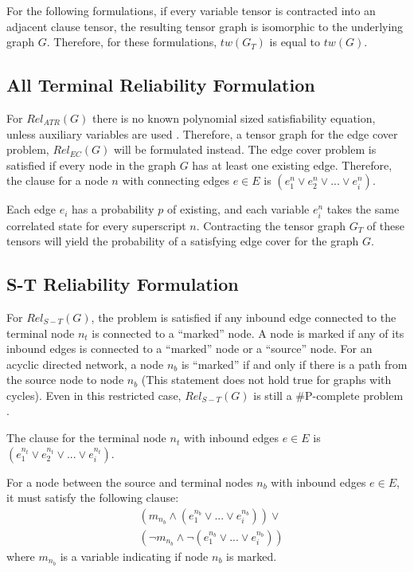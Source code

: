 For the following formulations, if every variable tensor is contracted into an adjacent clause tensor, the resulting tensor graph is isomorphic to the underlying graph \(G\). Therefore, for these formulations, \(tw(G_T)\) is equal to \(tw(G)\).

\hypertarget{all-terminal-reliability-formulation}{%
\subsection{All Terminal Reliability Formulation}\label{all-terminal-reliability-formulation}}

For \(Rel_{ATR}(G)\) there is no known polynomial sized satisfiability equation, unless auxiliary variables are used \cite{paredes2019principled}. Therefore, a tensor graph for the edge cover problem, \(Rel_{EC}(G)\) will be formulated instead. The edge cover problem is satisfied if every node in the graph \(G\) has at least one existing edge. Therefore, the clause for a node \(n\) with connecting edges \(e \in E\) is \((e_1^n \lor e_2^n \lor ... \lor e_i^n)\).

Each edge \(e_i\) has a probability \(p\) of existing, and each variable \(e_i^n\) takes the same correlated state for every superscript \(n\). Contracting the tensor graph \(G_T\) of these tensors will yield the probability of a satisfying edge cover for the graph \(G\).

\hypertarget{s-t-reliability-formulation}{%
\subsection{S-T Reliability Formulation}\label{s-t-reliability-formulation}}

For \(Rel_{S-T}(G)\), the problem is satisfied if any inbound edge connected to the terminal node \(n_t\) is connected to a ``marked'' node. A node is marked if any of its inbound edges is connected to a ``marked'' node or a ``source'' node. For an acyclic directed network, a node \(n_b\) is ``marked'' if and only if there is a path from the source node to node \(n_b\) (This statement does not hold true for graphs with cycles). Even in this restricted case, \(Rel_{S-T}(G)\) is still a \#P-complete problem \cite{provan1986complexity}.

The clause for the terminal node \(n_t\) with inbound edges \(e \in E\) is \((e_1^{n_t} \lor e_2^{n_t} \lor ... \lor e_i^{n_t})\).

For a node between the source and terminal nodes \(n_b\) with inbound edges \(e \in E\), it must satisfy the following clause: \begin{equation*}
\begin{split}
& (m_{n_b} \land (e_1^{n_b} \lor ... \lor e_i^{n_b})) \lor \\
& (\neg m_{n_b} \land \neg (e_1^{n_b} \lor ... \lor e_i^{n_b}))
\end{split}
\end{equation*} where \(m_{n_b}\) is a variable indicating if node \(n_b\) is marked.

